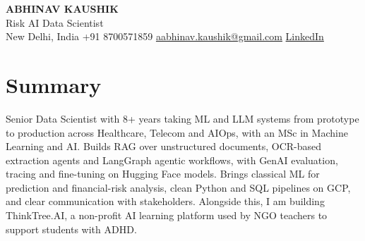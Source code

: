 \documentclass[10pt,a4paper]{article}
\begin{document}
\begin{center}
  {\LARGE\bfseries ABHINAV KAUSHIK}\\[2pt]
  {\large Risk AI Data Scientist}\\[2pt]
  New Delhi, India \textbar{} +91 8700571859 \textbar{} \href{mailto:aabhinav.kaushik@gmail.com}{aabhinav.kaushik@gmail.com} \textbar{} \href{https://www.linkedin.com/in/abhinav-kaushik10/}{LinkedIn}  
\end{center}

\section{Summary}
Senior Data Scientist with 8+ years taking ML and LLM systems from prototype to production across Healthcare, Telecom and AIOps, with an MSc in Machine Learning and AI. Builds RAG over unstructured documents, OCR-based extraction agents and LangGraph agentic workflows, with GenAI evaluation, tracing and fine-tuning on Hugging Face models. Brings classical ML for prediction and financial-risk analysis, clean Python and SQL pipelines on GCP, and clear communication with stakeholders. Alongside this, I am building ThinkTree.AI, a non-profit AI learning platform used by NGO teachers to support students with ADHD.
\end{document}
